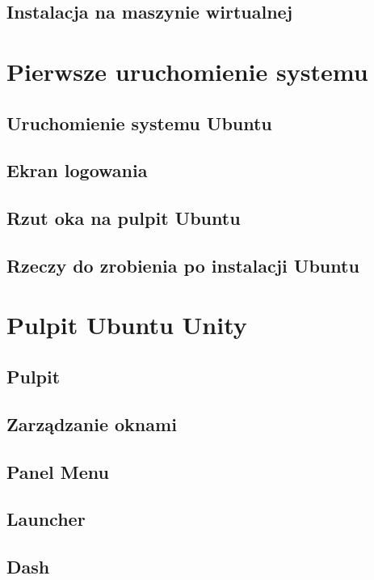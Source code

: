\documentclass[a4paper,11pt,oneside]{mwart}
\begin{document}
	\subsection{Instalacja na maszynie wirtualnej}
				
\section{Pierwsze uruchomienie systemu}
	\label{sec:pierwsze_uruchomienie}
	\subsection{Uruchomienie systemu Ubuntu}
		
	\subsection{Ekran logowania}
		
	\subsection{Rzut oka na pulpit Ubuntu}
		
	\subsection{Rzeczy do zrobienia po instalacji Ubuntu}
		\label{sec:rzeczy_do_zrobienia_po_instalacji}
		
\section{Pulpit Ubuntu Unity}
	\label{pulpit_unity}
	\subsection{Pulpit}
	\subsection{Zarządzanie oknami}
	\subsection{Panel Menu}
	\subsection{Launcher}
	\subsection{Dash}
\end{document}
